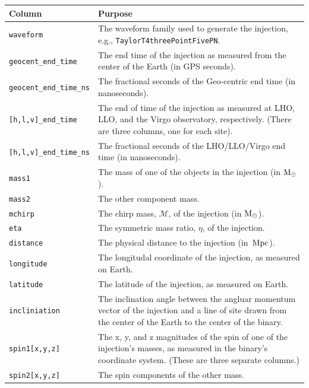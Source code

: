 \begin{table}[p]
\label{tab:sim_inspiral}
\center
\begin{tabular}{l | p{10cm}}
Column      &   Purpose     \\
\hline \hline
\texttt{waveform}    &   The waveform family used to generate the injection, e.g., \texttt{TaylorT4threePointFivePN}. \\
\hline
\texttt{geocent\_end\_time}     &   The end time of the injection as measured from the center of the Earth (in GPS seconds). \\
\hline
\texttt{geocent\_end\_time\_ns}     & The fractional seconds of the Geo-centric end time (in nanoseconds). \\
\hline
\texttt{[h,l,v]\_end\_time}   & The end of time of the injection as measured at \ac{LHO}, \ac{LLO}, and the Virgo observatory, respectively. (There are three columns, one for each site). \\
\hline
\texttt{[h,l,v]\_end\_time\_ns}   & The fractional seconds of the \ac{LHO}/\ac{LLO}/Virgo end time (in nanoseconds). \\
\hline
\texttt{mass1}      & The mass of one of the objects in the injection (in $\mathrm{M_\odot}$). \\
\hline
\texttt{mass2}      & The other component mass. \\
\hline
\texttt{mchirp}     & The chirp mass, $\mathcal{M}$, of the injection (in $\mathrm{M_\odot}$). \\
\hline
\texttt{eta}        & The symmetric mass ratio, $\eta$, of the injection. \\
\hline
\texttt{distance}   & The physical distance to the injection (in $\,\mathrm{Mpc}$). \\
\hline
\texttt{longitude}  & The longitudal coordinate of the injection, as measured on Earth. \\
\hline
\texttt{latitude}   & The latitude of the injection, as measured on Earth. \\
\hline
\texttt{incliniation}   &   The inclination angle between the angluar momentum vector of the injection and a line of site drawn from the center of the Earth to the center of the binary. \\
\hline
\texttt{spin1[x,y,z]}   &   The x, y, and z magnitudes of the spin of one of the injection's masses, as measured in the binary's coordinate system. (These are three separate columns.) \\
\hline
\texttt{spin2[x,y,z]}   &   The spin components of the other mass. \\

\end{tabular}
\end{table}
